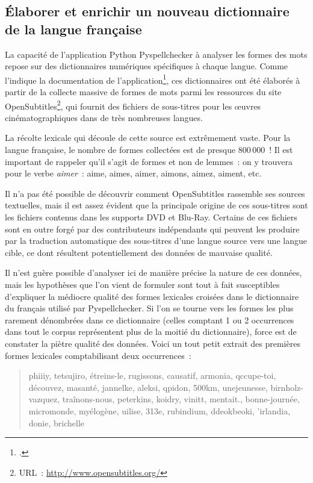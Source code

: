 \documentclass[a4paper,12pt,twoside]{book}
\begin{document}
			\subsection{Élaborer et enrichir un nouveau dictionnaire de la langue française}
				La capacité de l'application Python Pyspellchecker à analyser les formes des mots repose sur des dictionnaires numériques spécifiques à chaque langue. Comme l'indique la documentation de l'application\footcite{barrusPyspellcheckerPurePython}, ces dictionnaires ont été élaborés à partir de la collecte massive de formes de mots parmi les ressources du site OpenSubtitles\footnote{URL~: \url{http://www.opensubtitles.org/}}, qui fournit des fichiers de sous-titres pour les œuvres cinématographiques dans de très nombreuses langues.
				
				La récolte lexicale qui découle de cette source est extrêmement vaste. Pour la langue française, le nombre de formes collectées est de presque 800\,000~! Il est important de rappeler qu'il s'agit de formes et non de lemmes~: on y trouvera pour le verbe \textit{aimer}~: aime, aimes, aimer, aimons, aimez, aiment, etc.
				
				Il n'a pas été possible de découvrir comment OpenSubtitles rassemble ses sources textuelles, mais il est assez évident que la principale origine de ces sous-titres sont les fichiers contenus dans les supports DVD et Blu-Ray. Certains de ces fichiers sont en outre forgé par des contributeurs indépendants qui peuvent les produire par la traduction automatique des sous-titres d'une langue source vers une langue cible, ce dont résultent potentiellement des données de mauvaise qualité.
				
				Il n'est guère possible d'analyser ici de manière précise la nature de ces données, mais les hypothèses que l'on vient de formuler sont tout à fait susceptibles d'expliquer la médiocre qualité des formes lexicales croisées dans le dictionnaire du français utilisé par Pyspellchecker. Si l'on se tourne vers les formes les plus rarement dénombrées dans ce dictionnaire (celles comptant 1 ou 2 occurrences dans tout le corpus représentent plus de la moitié du dictionnaire), force est de constater la piètre qualité des données. Voici un tout petit extrait des premières formes lexicales comptabilisant deux occurrences~: 
				
				\begin{quote}
					phiiiy, tetsujiro, étreins-le, rugissons, causatif, armonia, qccupe-toi, découvez, masanté, jannelke, aleksi, qpidon, 500km, unejeunesse, birnholz-vazquez, traînons-nous, peterkins, koidry, vinitt, mentait., bonne-journée, micromonde, myélogène, uilise, 313e, rubindium, ddeokbeoki, 'irlandia, donie, brichelle
				\end{quote}
			
\end{document}
